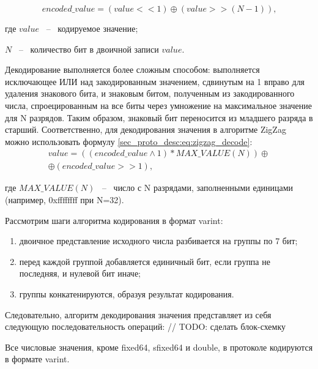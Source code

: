 \begin{equation}
    \label{sec_proto_desc:eq:zigzag}
    encoded\_value = (value << 1) \oplus (value >> (N - 1)) \text{,}
\end{equation}
\begin{explanationx}
\item [где] $ value $ ~--~ кодируемое значение;
\item       $ N $ ~--~ количество бит в двоичной записи $ value $.
\end{explanationx}

Декодирование выполняется более сложным способом: выполняется исключающее ИЛИ над закодированным значением,
сдвинутым на 1 вправо для удаления знакового бита, и знаковым битом, полученным из закодированного числа,
спроецированным на все биты через умножение на максимальное значение для N разрядов.
Таким образом, знаковый бит переносится из младшего разряда в старший. Соответственно, для декодирования значения в алгоритме ZigZag можно использовать формулу \ref{sec_proto_desc:eq:zigzag_decode}:
\begin{gather}
    \label{sec_proto_desc:eq:zigzag_decode}
        value = ((encoded\_value \land 1) * MAX\_VALUE(N)) \oplus \nonumber\\
        \oplus (encoded\_value >> 1) \text{,}
\end{gather}
\begin{explanationx}
\item [где] $ MAX\_VALUE(N) $ ~--~ число с N разрядами, заполненными единицами (например, 0xffffffff при N=32).
\end{explanationx}

Рассмотрим шаги алгоритма кодирования в формат varint:

\begin{enumerate}
    \item двоичное представление исходного числа разбивается на группы по 7 бит;
    \item перед каждой группой добавляется единичный бит, если группа не последняя, и нулевой бит иначе;
    \item группы конкатенируются, образуя результат кодирования.
\end{enumerate}

Следовательно, алгоритм декодирования значения представляет из себя следующую последовательность операций:
// TODO: сделать блок-схемку

Все числовые значения, кроме fixed64, sfixed64 и double, в протоколе кодируются в формате varint.

